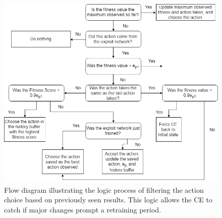 \begin{figure}[ht]
\includegraphics[width=\textwidth]{figures/action_acceptance_protocol.png}
\caption{Flow diagram illustrating the logic process of filtering the action choice based on previously seen results. This logic allows the CE to catch if major changes prompt a retraining period.}\label{fig:action_acceptance_protocol}
\end{figure}

